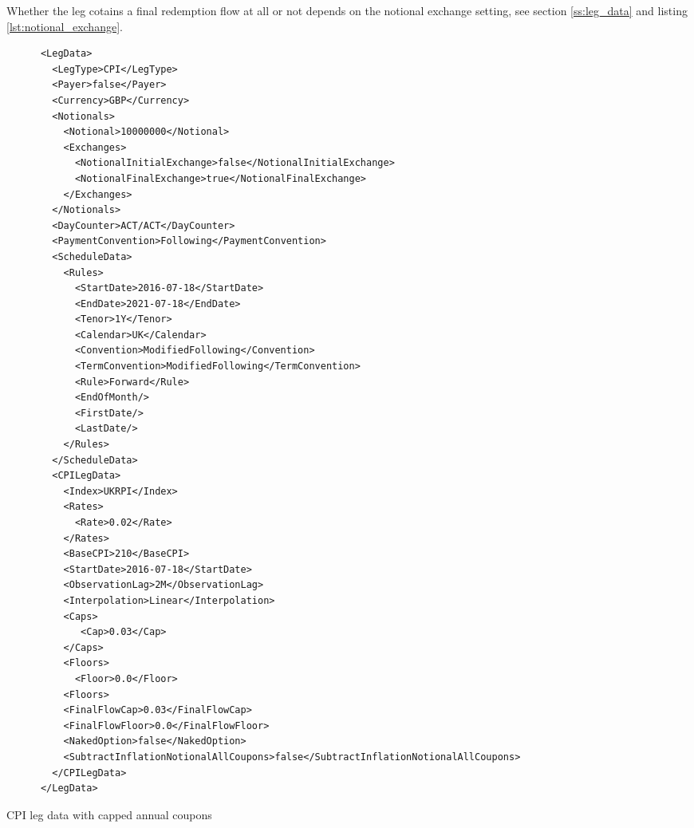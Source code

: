 Whether the leg cotains a final redemption flow at all or not depends on the
 notional exchange setting, see section \ref{ss:leg_data} and listing \ref{lst:notional_exchange}.

\begin{listing}[H]
\begin{verbatim}
      <LegData>
        <LegType>CPI</LegType>
        <Payer>false</Payer>
        <Currency>GBP</Currency>
        <Notionals>
          <Notional>10000000</Notional>
          <Exchanges>
            <NotionalInitialExchange>false</NotionalInitialExchange>
            <NotionalFinalExchange>true</NotionalFinalExchange>
          </Exchanges>          
        </Notionals>
        <DayCounter>ACT/ACT</DayCounter>
        <PaymentConvention>Following</PaymentConvention>
        <ScheduleData>
          <Rules>
            <StartDate>2016-07-18</StartDate>
            <EndDate>2021-07-18</EndDate>
            <Tenor>1Y</Tenor>
            <Calendar>UK</Calendar>
            <Convention>ModifiedFollowing</Convention>
            <TermConvention>ModifiedFollowing</TermConvention>
            <Rule>Forward</Rule>
            <EndOfMonth/>
            <FirstDate/>
            <LastDate/>
          </Rules>
        </ScheduleData>
        <CPILegData>
          <Index>UKRPI</Index>
          <Rates>
            <Rate>0.02</Rate>
          </Rates>
          <BaseCPI>210</BaseCPI>
          <StartDate>2016-07-18</StartDate>
          <ObservationLag>2M</ObservationLag>
          <Interpolation>Linear</Interpolation>
          <Caps>
             <Cap>0.03</Cap>
          </Caps>
          <Floors>
            <Floor>0.0</Floor>
          <Floors>
          <FinalFlowCap>0.03</FinalFlowCap>
          <FinalFlowFloor>0.0</FinalFlowFloor>
          <NakedOption>false</NakedOption>
          <SubtractInflationNotionalAllCoupons>false</SubtractInflationNotionalAllCoupons>         
        </CPILegData>
      </LegData>
\end{verbatim}
\caption{CPI leg data with capped annual coupons}
\label{lst:cpilegdata}
\end{listing}

